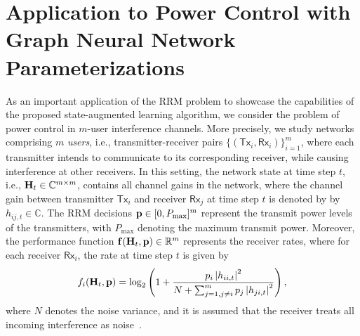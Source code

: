 \documentclass[lettersize,journal]{IEEEtran}
\begin{document}
\section{Application to Power Control with \\ Graph Neural Network Parameterizations}\label{sec:power_control}
As an important application of the RRM problem to showcase the capabilities of the proposed state-augmented learning algorithm, we consider the problem of power control in $m$-user interference channels. More precisely, we study networks comprising $m$ \emph{users}, i.e., transmitter-receiver pairs $\{(\mathsf{Tx}_i, \mathsf{Rx}_i)\}_{i=1}^m$, where each transmitter intends to communicate to its corresponding receiver, while causing interference at other receivers. In this setting, the network state at time step $t$, i.e., ${\mathbf H}_t\in\mathbb{C}^{m \times m}$, contains all channel gains in the network, where the channel gain between transmitter $\mathsf{Tx}_i$ and receiver $\mathsf{Rx}_j$ at time step $t$ is denoted by by $h_{ij, t}\in\mathbb{C}$. The RRM decisions ${\mathbf p} \in [0, P_{\max}]^m$ represent the transmit power levels of the transmitters, with $P_{\max}$ denoting the maximum transmit power. Moreover, the performance function ${\mathbf f}({\mathbf H}_t, {\mathbf p})\in{\mathbb R}^m$ represents the receiver rates, where for each receiver $\mathsf{Rx}_i$, the rate at time step $t$ is given by
\begin{align}
f_i({\mathbf H}_t, {\mathbf p}) = \log_2\left(1+\frac{p_i \left|h_{ii,t}\right|^2}{N + \sum_{j=1, j\neq i}^m p_j \left|h_{ji,t}\right|^2}\right),
\end{align}
where $N$ denotes the noise variance, and it is assumed that the receiver treats all incoming interference as noise~\cite{annapureddy2009gaussian,geng2015optimality}.
\end{document}
